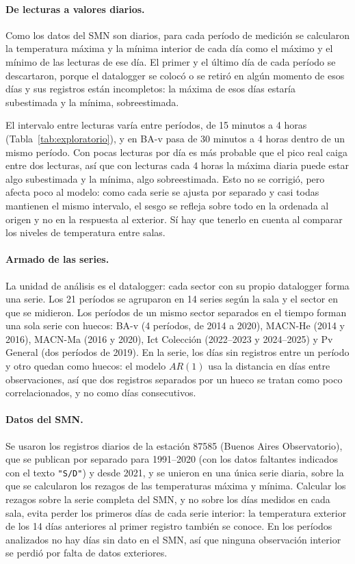 \documentclass[11pt,a4paper]{article}
\begin{document}
\paragraph{De lecturas a valores diarios.} Como los datos del SMN son diarios, para cada período de medición se calcularon la temperatura máxima y la mínima interior de cada día como el máximo y el mínimo de las lecturas de ese día. El primer y el último día de cada período se descartaron, porque el datalogger se colocó o se retiró en algún momento de esos días y sus registros están incompletos: la máxima de esos días estaría subestimada y la mínima, sobreestimada.

El intervalo entre lecturas varía entre períodos, de 15 minutos a 4 horas (Tabla~\ref{tab:exploratorio}), y en BA-v pasa de 30 minutos a 4 horas dentro de un mismo período. Con pocas lecturas por día es más probable que el pico real caiga entre dos lecturas, así que con lecturas cada 4 horas la máxima diaria puede estar algo subestimada y la mínima, algo sobreestimada. Esto no se corrigió, pero afecta poco al modelo: como cada serie se ajusta por separado y casi todas mantienen el mismo intervalo, el sesgo se refleja sobre todo en la ordenada al origen y no en la respuesta al exterior. Sí hay que tenerlo en cuenta al comparar los niveles de temperatura entre salas.

\paragraph{Armado de las series.} La unidad de análisis es el datalogger: cada sector con su propio datalogger forma una serie. Los 21 períodos se agruparon en 14 series según la sala y el sector en que se midieron. Los períodos de un mismo sector separados en el tiempo forman una sola serie con huecos: BA-v (4 períodos, de 2014 a 2020), MACN-He (2014 y 2016), MACN-Ma (2016 y 2020), Ict Colección (2022--2023 y 2024--2025) y Pv General (dos períodos de 2019). En la serie, los días sin registros entre un período y otro quedan como huecos: el modelo $AR(1)$ usa la distancia en días entre observaciones, así que dos registros separados por un hueco se tratan como poco correlacionados, y no como días consecutivos.


\paragraph{Datos del SMN.} Se usaron los registros diarios de la estación 87585 (Buenos Aires Observatorio), que se publican por separado para 1991--2020 (con los datos faltantes indicados con el texto \texttt{"S/D"}) y desde 2021, y se unieron en una única serie diaria, sobre la que se calcularon los rezagos de las temperaturas máxima y mínima. Calcular los rezagos sobre la serie completa del SMN, y no sobre los días medidos en cada sala, evita perder los primeros días de cada serie interior: la temperatura exterior de los 14 días anteriores al primer registro también se conoce. En los períodos analizados no hay días sin dato en el SMN, así que ninguna observación interior se perdió por falta de datos exteriores.
\end{document}
